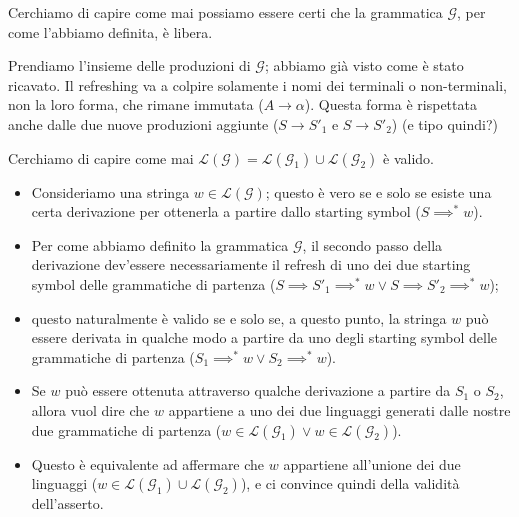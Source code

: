 \documentclass[class=book, crop=false, oneside]{standalone}
\begin{document}
\begin{osservazione}
  Cerchiamo di capire come mai possiamo essere certi che la grammatica \(\mathcal{G}\), per come l'abbiamo definita, è libera.

  Prendiamo l'insieme delle produzioni di \(\mathcal{G}\); abbiamo già visto come è stato ricavato. Il refreshing va a colpire solamente i nomi dei terminali o non-terminali, non la loro forma, che rimane immutata (\(A \rightarrow \alpha\)). Questa forma è rispettata anche dalle due nuove produzioni aggiunte (\(S \rightarrow S'_1\) e \(S \rightarrow S'_2\)) (e tipo quindi?)

\end{osservazione}

\begin{osservazione}
  Cerchiamo di capire come mai  \(\mathcal{L(G)} = \mathcal{L}(\mathcal{G}_1)  \cup \mathcal{L}(\mathcal{G}_2) \) è valido.
  \begin{itemize}
    \item Consideriamo una stringa \(w \in \mathcal{L(G)}\); questo è vero se e solo se esiste una certa derivazione per ottenerla a partire dallo starting symbol (\(S \implies^* w\)).
    \item Per come abbiamo definito la grammatica \(\mathcal{G}\), il secondo passo della derivazione dev'essere necessariamente il refresh di uno dei due starting symbol delle grammatiche di partenza (\(S \implies S'_1 \implies^* w \lor S \implies S'_2 \implies^* w\));
    \item questo naturalmente è valido se e solo se, a questo punto, la stringa \(w\) può essere derivata in qualche modo a partire da uno degli starting symbol delle grammatiche di partenza (\(S_1 \implies^* w \lor S_2 \implies^* w\)).
    \item Se \(w\) può essere ottenuta attraverso qualche derivazione a partire da \(S_1\) o \(S_2\), allora vuol dire che \(w\) appartiene a uno dei due linguaggi generati dalle nostre due grammatiche di partenza (\(w \in \mathcal{L}(\mathcal{G}_1)  \lor w \in \mathcal{L}(\mathcal{G}_2) \)).
    \item Questo è equivalente ad affermare che \(w\) appartiene all'unione dei due linguaggi (\(w \in \mathcal{L}(\mathcal{G}_1)  \cup \mathcal{L}(\mathcal{G}_2) \)), e ci convince quindi della validità dell'asserto.
  \end{itemize}
\end{osservazione}
\end{document}
